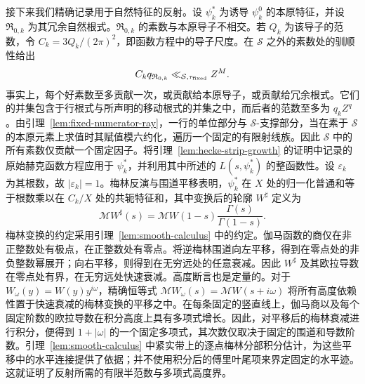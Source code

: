\documentclass[11pt,a4paper]{article}
\numberwithin{equation}{section}
\numberwithin{figure}{section}
\theoremstyle{definition}
\theoremstyle{remark}
\begin{document}
接下来我们精确记录用于自然特征的反射。设 \(\psi_k^*\) 为诱导 \(\psi_k^0\) 的本原特征，并设 \(\mathfrak R_{0,k}\) 为其冗余自然根式。\(\mathfrak R_{0,k}\) 的素数与本原导子不相交。若 \(Q_k\) 为该导子的范数，令
\(C_k=3Q_k/(2\pi)^2\)，即函数方程中的导子尺度。在 \(\mathcal S\) 之外的素数处的驯顺性给出
\begin{equation}
 C_kq_{\mathfrak R_{0,k}}
 \ll_{\mathcal S,\tau_{\rm fixed}} Z^M.
 \label{old-eq:2.1c}
\end{equation}
事实上，每个好素数至多贡献一次，或贡献给本原导子，或贡献给冗余根式。它们的并集包含于行根式与所声明的移动根式的并集之中，而后者的范数至多为 \(q_kZ^q\)。由引理~\ref{lem:fixed-numerator-ray}，一行的单位部分与 \(\mathcal S\)-支撑部分，当在素于 \(\mathcal S\) 的本原元素上求值时其赋值模六约化，遍历一个固定的有限射线族。因此 \(\mathcal S\) 中的所有素数仅贡献一个固定因子。将引理~\ref{lem:hecke-strip-growth} 的证明中记录的原始赫克函数方程应用于 \(\psi_k^*\)，并利用其中所述的 \(L(s,\psi_k^*)\) 的整函数性。设 \(\varepsilon_k\) 为其根数，故 \(|\varepsilon_k|=1\)。梅林反演与围道平移表明，\(\psi_k^*\) 在 \(X\) 处的归一化普通和等于根数乘以在 \(C_k/X\) 处的共轭特征和，其中变换后的轮廓 \(W^\sharp\) 定义为
\[
 \mathcal M W^\sharp(s)
 =\mathcal M W(1-s)\frac{\Gamma(s)}{\Gamma(1-s)}.
\]
梅林变换的约定采用引理~\ref{lem:smooth-calculus} 中的约定。伽马函数的商仅在非正整数处有极点，在正整数处有零点。将逆梅林围道向左平移，得到在零点处的非负整数幂展开；向右平移，则得到在无穷远处的任意衰减。因此 \(W^\sharp\) 及其欧拉导数在零点处有界，在无穷远处快速衰减。高度断言也是定量的。对于 \(W_\omega(y)=W(y)y^{i\omega}\)，精确恒等式 \(\mathcal M W_\omega(s)=\mathcal M W(s+i\omega)\) 将所有高度依赖性置于快速衰减的梅林变换的平移之中。在每条固定的竖直线上，伽马商以及每个固定阶数的欧拉导数在积分高度上具有多项式增长。因此，对平移后的梅林衰减进行积分，便得到 \(1+|\omega|\) 的一个固定多项式，其次数仅取决于固定的围道和导数阶数。引理~\ref{lem:smooth-calculus} 中紧实带上的逐点梅林分部积分估计，为这些平移中的水平连接提供了依据；并不使用积分后的傅里叶尾项来界定固定的水平迹。这就证明了反射所需的有限半范数与多项式高度界。
\end{document}
